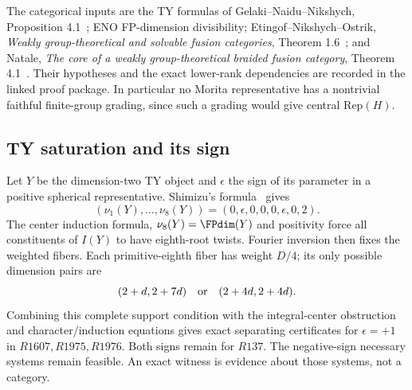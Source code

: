 The categorical inputs are the TY formulas of Gelaki--Naidu--Nikshych,
Proposition 4.1~\cite{RetryGNN}; ENO FP-dimension divisibility; Etingof--Nikshych--Ostrik,
\emph{Weakly group-theoretical and solvable fusion categories},
Theorem 1.6~\cite{RetryENO}; and Natale, \emph{The core of a weakly group-theoretical
braided fusion category}, Theorem 4.1~\cite{RetryNatale}. Their hypotheses and the exact
lower-rank dependencies are recorded in the linked proof package.
In particular no Morita representative has a nontrivial faithful
finite-group grading, since such a grading would give central Rep$(H)$.

\subsection{TY saturation and its sign}
Let $Y$ be the dimension-two TY object and $\epsilon$ the sign of its
parameter in a positive spherical representative. Shimizu's formula~\cite{RetryShimizu} gives
\[
 (\nu_1(Y),\ldots,\nu_8(Y))=(0,\epsilon,0,0,0,\epsilon,0,2).
\]
The center induction formula, $\nu_8(Y)=\FPdim(Y)$ and positivity force
all constituents of $I(Y)$ to have eighth-root twists. Fourier inversion
then fixes the weighted fibers. Each primitive-eighth fiber has weight
$D/4$; its only possible dimension pairs are
\[
 (2+d,2+7d)\quad\hbox{or}\quad(2+4d,2+4d).
\]
Combining this complete support condition with the integral-center
obstruction and character/induction equations gives exact separating
certificates for $\epsilon=+1$ in $R1607,R1975,R1976$. Both signs remain
for $R137$. The negative-sign necessary systems remain feasible.
An exact witness is evidence about those systems, not a category.

